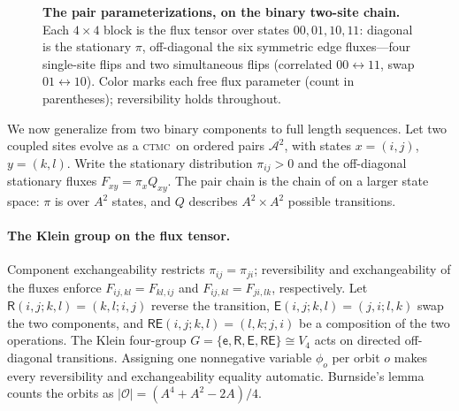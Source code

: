 \documentclass{article}
\newcommand{\CTBN}{\textsc{ctbn}}
\newcommand{\CTMC}{\textsc{ctmc}}
\newcommand{\Coupledm}{\textsc{Coupled}}
\newcommand{\Exchm}{\textsc{Exchangeable}}
\newcommand{\Metrop}{\textsc{Metropolis}}
\newcommand{\Xset}{\mathcal{A}}
\begin{document}
\begin{figure}[t]
\begin{minipage}[c]{0.62\textwidth}
{}
\end{minipage}\hfill
\begin{minipage}[c]{0.35\textwidth}
\caption{\textbf{The pair parameterizations, on the binary two-site chain.} Each
$4\times4$ block is the flux tensor over states $00,01,10,11$: diagonal is the stationary
$\pi$, off-diagonal the six symmetric edge fluxes---four single-site flips and two
simultaneous flips (correlated $00\!\leftrightarrow\!11$, swap
$01\!\leftrightarrow\!10$). Color marks each free flux parameter (count in
parentheses); reversibility holds throughout.
}
\label{fig:params}
\end{minipage}
\end{figure}
We now generalize from two binary components to full length sequences.
Let two coupled sites evolve as a \CTMC\ on ordered pairs
$\Xset^2$, with states $x=(i,j)$, $y=(k,l)$. 
Write the stationary distribution $\pi_{ij}>0$ and the off-diagonal stationary 
fluxes $F_{xy}=\pi_xQ_{xy}$. 
The pair chain is the chain of  on a larger state space:
$\pi$ is over $A^2$ states, and
$Q$ describes $A^2\times A^2$ possible transitions.

\paragraph{The Klein group on the flux tensor.} Component exchangeability
restricts $\pi_{ij}=\pi_{ji}$; reversibility and exchangeability of the fluxes
enforce $F_{ij,kl}=F_{kl,ij}$ and $F_{ij,kl}=F_{ji,lk}$, respectively. Let
$\mathsf{R}(i,j;k,l)=(k,l;i,j)$ reverse the transition, $\mathsf{E}(i,j;k,l)=(j,i;l,k)$
swap the two components, and $\mathsf{RE}(i,j;k,l) = (l,k;j,i)$ be a composition of the two operations. The Klein four-group $G=\{\mathsf{e}, \mathsf{R}, \mathsf{E}, \mathsf{RE} \}\cong V_4$ 
acts on directed off-diagonal transitions. 
Assigning one nonnegative variable $\phi_o$ per orbit $o$ makes every reversibility and
exchangeability equality automatic. Burnside's lemma counts the orbits as
$|\mathcal O|=(A^4+A^2-2A)/4$.
\end{document}
